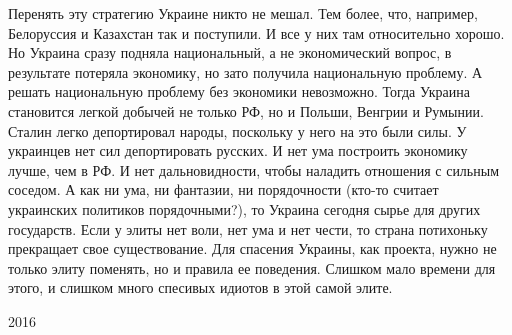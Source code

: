 Перенять эту стратегию Украине никто не мешал. Тем более, что, например,
Белоруссия и Казахстан так и поступили. И все у них там относительно хорошо. Но
Украина сразу подняла национальный, а не экономический вопрос, в результате
потеряла экономику, но зато получила национальную проблему. А решать
национальную проблему без экономики невозможно. Тогда Украина становится легкой
добычей не только РФ, но и Польши, Венгрии и Румынии. Сталин легко депортировал
народы, поскольку у него на это были силы. У украинцев нет сил депортировать
русских. И нет ума построить экономику лучше, чем в РФ. И нет дальновидности,
чтобы наладить отношения с сильным соседом. А как ни ума, ни фантазии, ни
порядочности (кто-то считает украинских политиков порядочными?), то Украина
сегодня сырье для других государств. Если у элиты нет воли, нет ума и нет
чести, то страна потихоньку прекращает свое существование. Для спасения
Украины, как проекта, нужно не только элиту поменять, но и правила ее
поведения. Слишком мало времени для этого, и слишком много спесивых идиотов в
этой самой элите.

2016

